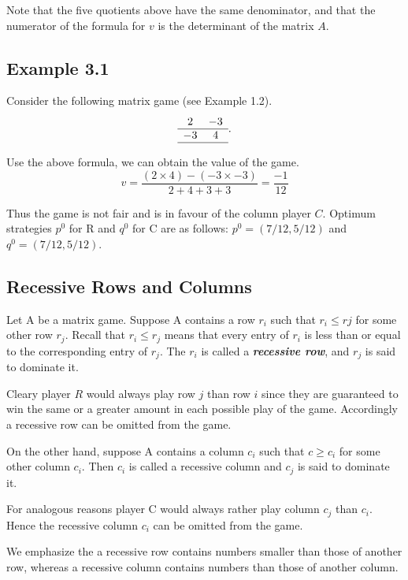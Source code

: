 \documentclass[]{report}
\begin{document}
Note that the five quotients above have the same denominator, and that the numerator of the formula for $v$ is the determinant of 
the matrix $A$.

\subsection*{Example 3.1}
Consider the following matrix game (see Example 1.2).
\[
\begin{array}{cc}
   2 & -3 \\ \hline
  -3 & 4 \\ \hline
\end{array}.
\]

Use the above formula, we can obtain the value of the game.
\[ v = \frac{(2\times4)-(-3 \times-3)}{2+4+3+3} = \frac{-1}{12} \]

Thus the game is not fair and is in favour of the column player $C$. Optimum strategies $p^0$ for R and $q^0$ for C are as follows:
$p^0 = (7/12,5/12)$ and $q^0 = (7/12,5/12)$.


\subsection{Recessive Rows and Columns}
Let A be a matrix game. Suppose A contains a row $r_i$ such that $r_i \leq rj$ for some other
row $r_j$.
Recall that $r_i\leq r_j$ means that every entry of $r_i$ is less than or equal to the corresponding entry of $r_j$.
The $r_i$ is called a \textbf{\textit{recessive row}}, and $r_j$ is said to dominate it.

Cleary player $R$ would always play row $j$ than row $i$ since they are guaranteed to win the same or a greater amount in each possible play of the game. Accordingly a recessive row can be omitted from the game.

On the other hand, suppose A contains a column $c_i$ such that $c \geq c_i$ for some other column $c_i$. Then $c_i$ is called
a recessive column and $c_j$ is said to dominate it.

For analogous reasons player C would always rather play column $c_j$ than $c_i$. Hence the recessive column $c_i$ can be
omitted from the game.

We emphasize the a recessive row contains numbers smaller than those of another
row, whereas a recessive column contains numbers than those of another column.
\end{document}
